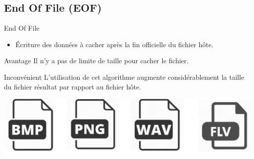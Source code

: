 \documentclass{beamer}
\begin{document}
    \subsection{End Of File (EOF)}
    \begin{frame}
    
	\begin{block}{End Of File}
	\begin{itemize}
	[circle]
	\item Écriture des données à cacher après la fin officielle du fichier 
	hôte. 
	\end{itemize}
	\end{block}
	
	\begin{exampleblock}{Avantage} 
	Il n'y a pas de limite de taille pour cacher le fichier. 
	\end{exampleblock}
	
	\begin{alertblock}{Inconvénient} 
	L'utilisation de cet algorithme augmente considérablement la taille du 
	fichier résultat par rapport au fichier hôte. 
	\end{alertblock}
	
	\hspace{2cm}
    \includegraphics[scale=0.2]{pictures/eof.png}
    
    \end{frame}
    
\end{document}
